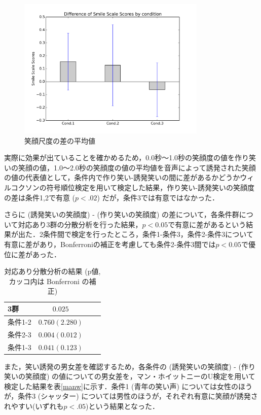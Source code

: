\documentclass[submit,techreq]{ec2014}
\begin{document}
\begin{figure}[h!]
  \centering  
\includegraphics[width=90mm, bb=0 0 600 450]{images/graph-diff.png}
\caption{笑顔尺度の差の平均値}
  \label{graph-avg}
\end{figure}

実際に効果が出ていることを確かめるため，0.0秒〜1.0秒の笑顔度の値を作り笑いの笑顔の値，1.0〜2.0秒の笑顔度の値の平均値を音声によって誘発された笑顔の値の代表値として，条件内で作り笑い-誘発笑いの間に差があるかどうかウィルコクソンの符号順位検定を用いて検定した結果，作り笑い-誘発笑いの笑顔度の差は条件1,2で有意 ($p<.02$) だが，条件3では有意ではなかった．

さらに (誘発笑いの笑顔度) - (作り笑いの笑顔度) の差について，各条件群について対応あり3群の分散分析を行った結果，$p<0.05$で有意に差があるという結果が出た．2条件間で検定を行ったところ，条件1-条件3，条件2-条件3について有意に差があり，Bonferroniの補正を考慮しても条件2-条件3間では$p<0.05$で優位に差があった．

\begin{table}[htb]
  \begin{center}
    \caption{対応あり分散分析の結果 (p値, カッコ内は Bonferroni の補正)}
    \begin{tabular}{|l|c|r||r|} \hline
      3群 & $0.025$  \\ \hline 
      条件1-2 & $0.760 (2.280)$ \\ \hline
      条件2-3 & $0.004 (0.012)$ \\ \hline
      条件1-3 & $0.041 (0.123)$ \\ \hline
    \end{tabular}
    \label{tab:price}
  \end{center}
\end{table}


また，笑い誘発の男女差を確認するため，各条件の (誘発笑いの笑顔度) - (作り笑いの笑顔度) の値についての男女差を，マン・ホイットニーのU検定を用いて検定した結果を表\ref{manw}に示す．条件1 (青年の笑い声) については女性のほうが，条件3 (シャッター) については男性のほうが，それぞれ有意に笑顔が誘発されやすい(いずれも$p < .05$)という結果となった．
\end{document}
